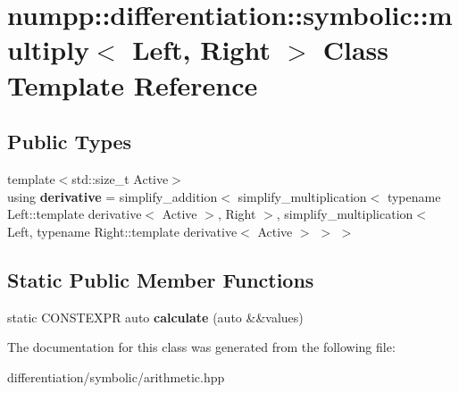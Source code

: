 \hypertarget{classnumpp_1_1differentiation_1_1symbolic_1_1multiply}{}\section{numpp\+:\+:differentiation\+:\+:symbolic\+:\+:multiply$<$ Left, Right $>$ Class Template Reference}
\label{classnumpp_1_1differentiation_1_1symbolic_1_1multiply}
\subsection*{Public Types}
\begin{DoxyCompactItemize}
\item 
\mbox{\label{classnumpp_1_1differentiation_1_1symbolic_1_1multiply_a0d483b631e2e23b2f0f316ff192213aa}} 
{\footnotesize template$<$std\+::size\+\_\+t Active$>$ }\\using {\bfseries derivative} = simplify\+\_\+addition$<$ simplify\+\_\+multiplication$<$ typename Left\+::template derivative$<$ Active $>$, Right $>$, simplify\+\_\+multiplication$<$ Left, typename Right\+::template derivative$<$ Active $>$ $>$ $>$
\end{DoxyCompactItemize}
\subsection*{Static Public Member Functions}
\begin{DoxyCompactItemize}
\item 
\mbox{\label{classnumpp_1_1differentiation_1_1symbolic_1_1multiply_a02603172de5069f4a519d66ca326cd53}} 
static C\+O\+N\+S\+T\+E\+X\+PR auto {\bfseries calculate} (auto \&\&values)
\end{DoxyCompactItemize}


The documentation for this class was generated from the following file\+:\begin{DoxyCompactItemize}
\item 
differentiation/symbolic/arithmetic.\+hpp\end{DoxyCompactItemize}
